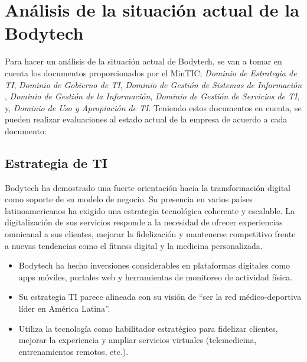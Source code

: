 
\section{Análisis de la situación actual de la Bodytech}

Para hacer un análisis de la situación actual de Bodytech, se van a tomar en cuenta los documentos proporcionados por el MinTIC; \textit{Dominio de Estrategia de TI}\cite{mintic_estrategia_2022}, \textit{Dominio de Gobierno de TI}\cite{mintic_gobierno_2022}, \textit{Dominio de Gestión de Sistemas de Información} \cite{mintic_sistemas_2022}, \textit{Dominio de Gestión de la Información}\cite{mintic_informacion_2022}, \textit{Dominio de Gestión de Servicios de TI}\cite{mintic_servicios_2022}, y, \textit{Dominio de Uso y Apropiación de TI}\cite{mintic_apropiacion_2022}. Teniendo estos documentos en cuenta, se pueden realizar evaluaciones al estado actual de la empresa de acuerdo a cada documento:

\subsection{Estrategia de TI}

Bodytech ha demostrado una fuerte orientación hacia la transformación digital como soporte de su modelo de negocio. Su presencia en varios países latinoamericanos ha exigido una estrategia tecnológica coherente y escalable. La digitalización de sus servicios responde a la necesidad de ofrecer experiencias omnicanal a sus clientes, mejorar la fidelización y mantenerse competitivo frente a nuevas tendencias como el fitness digital y la medicina personalizada.

\begin{itemize}
  \item Bodytech ha hecho inversiones considerables en plataformas digitales como apps móviles, portales web y herramientas de monitoreo de actividad física.
  \item Su estrategia TI parece alineada con su visión de ``ser la red médico-deportiva líder en América Latina''.
  \item Utiliza la tecnología como habilitador estratégico para fidelizar clientes, mejorar la experiencia y ampliar servicios virtuales (telemedicina, entrenamientos remotos, etc.).
\end{itemize}

